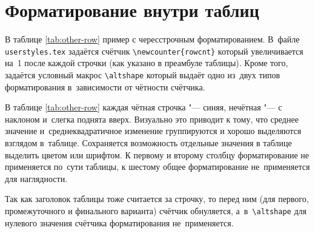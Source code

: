 \section{Форматирование внутри таблиц}\label{app:B3}

В таблице \cref{tab:other-row} пример с чересстрочным
форматированием. В~файле \verb+userstyles.tex+  задаётся счётчик
\verb+\newcounter{rowcnt}+ который увеличивается на~1 после каждой
строчки (как указано в преамбуле таблицы). Кроме того, задаётся
условный макрос \verb+\altshape+ который выдаёт одно
из~двух типов форматирования в~зависимости от чётности счётчика.

В таблице \cref{tab:other-row} каждая чётная строчка "--- синяя,
нечётная "--- с наклоном и~слегка поднята вверх. Визуально это приводит
к тому, что среднее значение и~среднеквадратичное изменение
группируются и хорошо выделяются взглядом в~таблице. Сохраняется
возможность отдельные значения в таблице выделить цветом или
шрифтом. К первому и второму столбцу форматирование не применяется
по~сути таблицы, к шестому общее форматирование не~применяется для
наглядности.

Так как заголовок таблицы тоже считается за строчку, то перед ним (для
первого, промежуточного и финального варианта) счётчик обнуляется,
а~в~\verb+\altshape+ для нулевого значения счётчика форматирования
не~применяется.


